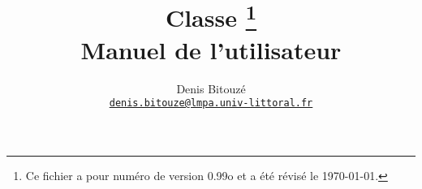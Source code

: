 \title{%
  Classe \texorpdfstring{\yat}{yathesis}\thanks{Ce fichier a pour numéro de
    version 0.99o et a été révisé le \today.}\\
  Manuel de l'utilisateur
}
%
\author{%
  Denis Bitouzé\\
  \texorpdfstring{%
    \href{mailto:denis.bitouze@lmpa.univ-littoral.fr}%
    {\nolinkurl{denis.bitouze@lmpa.univ-littoral.fr}}%
  }{%
    denis.bitouze@lmpa.univ-littoral.fr%
  }%
}
%
\maketitle
